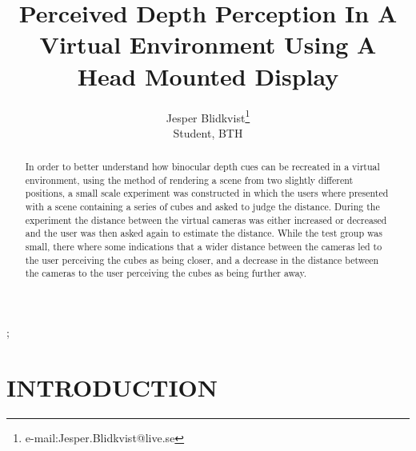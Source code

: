 \documentclass[tog]{acmsiggraph}
\title{Perceived Depth Perception In A Virtual Environment Using A Head Mounted Display}
\author{Jesper Blidkvist\thanks{e-mail:Jesper.Blidkvist@live.se}\\Student, BTH}
\begin{document}


\maketitle

\begin{abstract}
In order to better understand how binocular depth cues can be recreated in a virtual environment, using the method of rendering a scene from two slightly different positions, a small scale experiment was constructed in which the users where presented with a scene containing a series of cubes and asked to judge the distance. During the experiment the distance between the virtual cameras was either increased or decreased and the user was then asked again to estimate the distance. While the test group was small, there where some indications that a wider distance between the cameras led to the user perceiving the cubes as being closer, and a decrease in the distance between the cameras to the user perceiving the cubes as being further away.



\end{abstract}

\begin{CRcatlist}
  ;
\end{CRcatlist}

\keywordlist


\copyrightspace

\section{INTRODUCTION}
\end{document}
